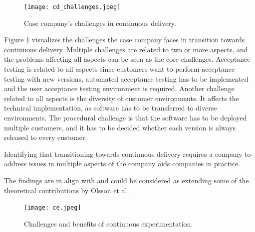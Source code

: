 \documentclass[english]{tktltiki2}
\theoremstyle{definition}
\theoremstyle{remark}
\begin{document}
\begin{figure}[!htb]
	\centering
	\texttt{[image: cd\_challenges.jpeg]}
	\caption{Case company's challenges in continuous delivery.}
	\label{fig8}
\end{figure}

Figure \ref{fig8} visualizes the challenges the case company faces in transition towards continuous delivery. Multiple challenges are related to two or more aspects, and the problems affecting all aspects can be seen as the core challenges. Acceptance testing is related to all aspects since customers want to perform acceptance testing with new versions, automated acceptance testing has to be implemented and the user acceptance testing environment is required. Another challenge related to all aspects is the diversity of customer environments. It affects the technical implementation, as software has to be transferred to diverse environments. The procedural challenge is that the software has to be deployed multiple customers, and it has to be decided whether each version is always released to every customer. 

Identifying that transitioning towards continuous delivery requires a company to address issues in multiple aspects of the company aids companies in practice. 

The findings are in align with and could be considered as extending some of the theoretical contributions by Olsson et al. \cite{olsson2012climbing}










\begin{figure}[!htb]
	\centering
	\texttt{[image: ce.jpeg]}
	\caption{Challenges and benefits of continuous experimentation.}
	\label{fig9}
\end{figure}
\end{document}
